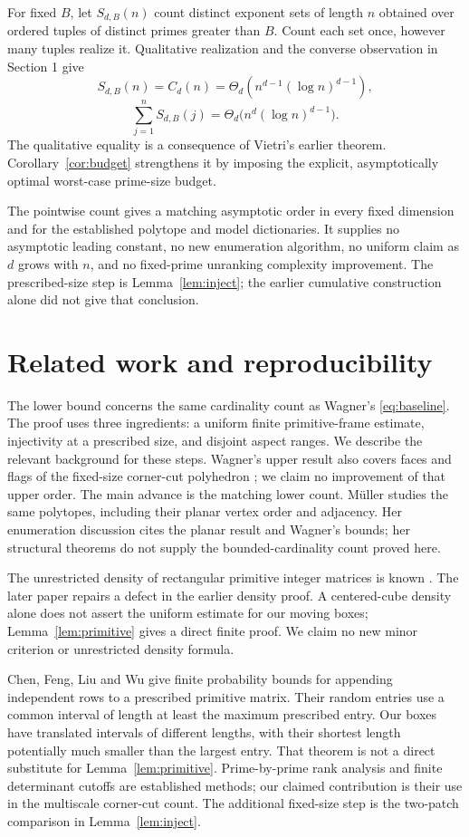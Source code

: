 \documentclass[11pt,a4paper]{article}
\theoremstyle{remark}
\begin{document}
For fixed \(B\), let \(S_{d,B}(n)\) count distinct exponent sets of
length \(n\) obtained over ordered tuples of distinct primes greater
than \(B\). Count each set once, however many tuples realize it.
Qualitative realization and the converse observation in Section 1 give
\[
 S_{d,B}(n)=C_d(n)=\Theta_d(n^{d-1}(\log n)^{d-1}),
\]\[
 \sum_{j=1}^n S_{d,B}(j)
   =\Theta_d\!\bigl(n^d(\log n)^{d-1}\bigr).
\]
The qualitative equality is a consequence of Vietri's earlier theorem.
Corollary~\ref{cor:budget} strengthens it by imposing the explicit,
asymptotically optimal worst-case prime-size budget.

The pointwise count gives a matching asymptotic order in every fixed
dimension and for the established polytope and model dictionaries.
It supplies no asymptotic leading constant, no new enumeration algorithm,
no uniform claim as \(d\) grows with \(n\), and no fixed-prime unranking
complexity improvement. The prescribed-size step is Lemma~\ref{lem:inject};
the earlier cumulative construction alone did not give that conclusion.

\section{Related work and reproducibility}
The lower bound concerns the same cardinality count as Wagner's
\eqref{eq:baseline}. The proof uses three ingredients: a uniform finite
primitive-frame estimate, injectivity at a prescribed size, and disjoint
aspect ranges. We describe the relevant background for these steps.
Wagner's upper result also covers faces and flags of the fixed-size
corner-cut polyhedron \cite[Section 3.5]{W03}; we claim no improvement
of that upper order. The main advance is the matching lower count.
M\"uller \cite[Sections 2--5]{Muller} studies the same polytopes,
including their planar vertex order and adjacency. Her enumeration
discussion \cite[Section 1, p.~324]{Muller} cites the planar result
and Wagner's bounds; her structural theorems do not supply the
bounded-cardinality count proved here.

The unrestricted density of rectangular primitive integer matrices is
known \cite{MRW,MW}. The later paper repairs a defect in the earlier
density proof. A centered-cube density alone does not assert the
uniform estimate for our moving boxes; Lemma~\ref{lem:primitive} gives
a direct finite proof. We claim no new minor criterion or unrestricted
density formula.

Chen, Feng, Liu and Wu \cite[Theorem 1]{CFLW} give finite probability
bounds for appending independent rows to a prescribed primitive matrix.
Their random entries use a common interval of length at least the
maximum prescribed entry. Our boxes have translated intervals of
different lengths, with their shortest length potentially much smaller
than the largest entry. That theorem is not a direct substitute for
Lemma~\ref{lem:primitive}. Prime-by-prime rank analysis and finite
determinant cutoffs are established methods; our claimed contribution
is their use in the multiscale corner-cut count. The additional fixed-size
step is the two-patch comparison in Lemma~\ref{lem:inject}.
\end{document}
